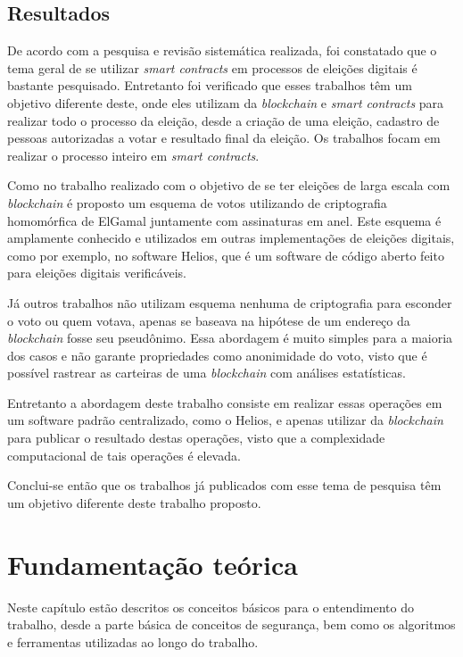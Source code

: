 \documentclass{ufsctex/ufsctex}
\begin{document}
\section{Resultados}

De acordo com a pesquisa e revisão sistemática realizada, foi constatado que o
tema geral de se utilizar \textit{smart contracts} em processos de eleições
digitais é bastante pesquisado. Entretanto foi verificado que esses trabalhos
têm um objetivo diferente deste, onde eles utilizam da \textit{blockchain} e
\textit{smart contracts} para realizar todo o processo da eleição, desde a
criação de uma eleição, cadastro de pessoas autorizadas a votar e resultado
final da eleição. Os trabalhos focam em realizar o processo inteiro em
\textit{smart contracts}.

Como no trabalho realizado com o objetivo de se ter eleições de larga escala
com \textit{blockchain} é proposto um esquema de votos utilizando de
criptografia homomórfica de ElGamal juntamente com assinaturas em anel.
\cite{WANG2018234} Este esquema é amplamente conhecido e utilizados em outras
implementações de eleições digitais, como por exemplo, no software Helios, que
é um software de código aberto feito para eleições digitais verificáveis.

Já outros trabalhos não utilizam esquema nenhuma de criptografia para esconder
o voto ou quem votava, apenas se baseava na hipótese de um endereço da
\textit{blockchain} fosse seu pseudônimo. \cite{Yavuz2018} Essa abordagem é
muito simples para a maioria dos casos e não garante propriedades como
anonimidade do voto, visto que é possível rastrear as carteiras de uma
\textit{blockchain} com análises estatísticas. \cite{Kosy2014}

Entretanto a abordagem deste trabalho consiste em realizar essas operações em
um software padrão centralizado, como o Helios, e apenas utilizar da
\textit{blockchain} para publicar o resultado destas operações, visto que a
complexidade computacional de tais operações é elevada.

Conclui-se então que os trabalhos já publicados com esse tema de pesquisa têm
um objetivo diferente deste trabalho proposto.

\chapter{Fundamentação teórica}

Neste capítulo estão descritos os conceitos básicos para o entendimento do
trabalho, desde a parte básica de conceitos de segurança, bem como os
algoritmos e ferramentas utilizadas ao longo do trabalho.
\end{document}

